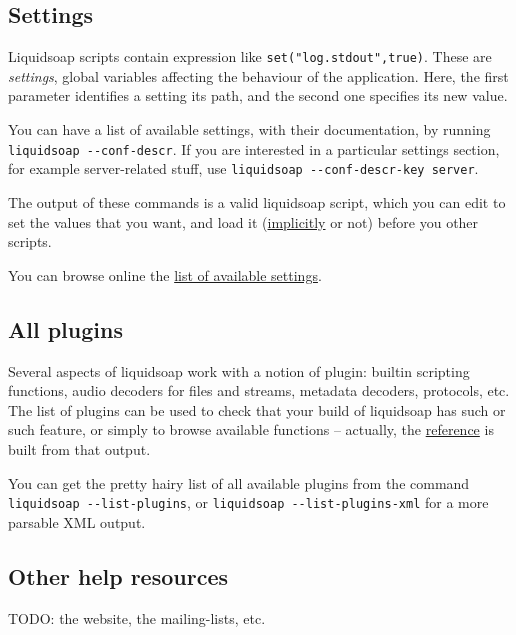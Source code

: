\subsection{Settings}
Liquidsoap scripts contain expression like \verb+set("log.stdout",true)+.  These
are \emph{settings}, global variables affecting the behaviour of the
application.  Here, the first parameter identifies a setting its path, and the
second one specifies its new value.

You can have a list of available settings, with their documentation, by running
\verb+liquidsoap --conf-descr+.  If you are interested in a particular settings
section, for example server-related stuff, use
\verb+liquidsoap --conf-descr-key server+.

The output of these commands is a valid liquidsoap script, which you can edit to
set the values that you want, and load it
(\href{script_loading.html}{implicitly} or not) before you other scripts.

You can browse online the \href{settings.html}{list of available settings}.

\subsection{All plugins}
Several aspects of liquidsoap work with a notion of plugin: builtin scripting
functions, audio decoders for files and streams, metadata decoders, protocols,
etc. The list of plugins can be used to check that your build of liquidsoap has
such or such feature, or simply to browse available functions -- actually, the
\href{reference.html}{reference} is built from that output.

You can get the pretty hairy list of all available plugins from the command
\verb+liquidsoap --list-plugins+, or \verb+liquidsoap --list-plugins-xml+ for a
more parsable XML output.

\subsection{Other help resources}
TODO: the website, the mailing-lists, etc.
